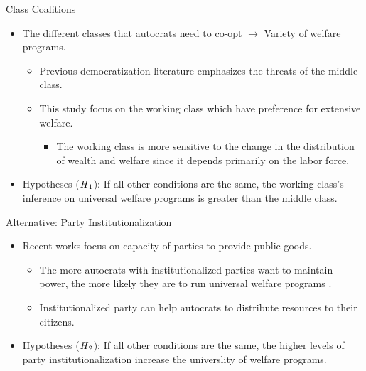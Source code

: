 \documentclass{Bredelebeamer}
\begin{document}
\begin{frame}{Class Coalitions}
\begin{itemize}
	\item The different classes that autocrats need to co-opt $\rightarrow$ Variety of welfare programs.
	\begin{itemize}
		\item Previous democratization literature emphasizes the threats of the middle class.
		\item This study focus on the working class which have preference for extensive welfare.
		\begin{itemize}
			\item The working class is more sensitive to the change in the distribution of wealth and welfare since it depends primarily on the labor force.
		\end{itemize}
	\end{itemize}
	\item Hypotheses ($\text{\textit{H}}_1$): If all other conditions are the same, the working class's inference on universal welfare programs is greater than the middle class.
\end{itemize}
\end{frame}

\begin{frame}{Alternative: Party Institutionalization}
\begin{itemize}
	\item Recent works focus on capacity of parties to provide public goods.
	\begin{itemize}
		\item The more autocrats with institutionalized parties want to maintain power, the more likely they are to run universal welfare programs \citep{Rasmussen2019}.
		\item Institutionalized party can help autocrats to distribute resources to their citizens.
	\end{itemize}
	\item Hypotheses ($\text{\textit{H}}_2$): If all other conditions are the same, the higher levels of party institutionalization increase the universlity of welfare programs.
\end{itemize}
\end{frame}
\end{document}
